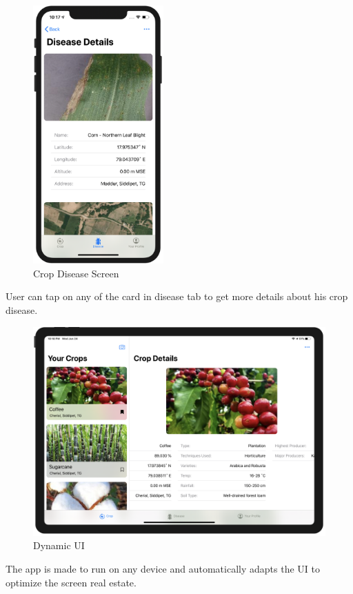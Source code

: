 \documentclass[../Report.tex]{subfiles}
\begin{document}
\begin{figure}[H]
    \centering
    \includegraphics[width=5cm]{images/disease_details.png}
    \caption{Crop Disease Screen}
    \label{fig:ss_disease_details}
\end{figure}

\noindent User can tap on any of the card in disease tab to get more details about his crop disease.

\begin{figure}[H]
    \centering
    \includegraphics[width=0.75\linewidth]{images/ipad.png}
    \caption{Dynamic UI}
    \label{fig:ss_ipad}
\end{figure}

\noindent The app is made to run on any device and automatically adapts the UI to optimize the screen real estate.
\end{document}
